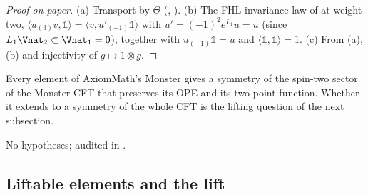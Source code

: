 \begin{proof}[Proof on paper]
(a) Transport by $\Theta$ (, ).  (b) The FHL invariance law of
 at weight two, $\langle u_{(3)}v,\mathbb1\rangle=\langle v,u'_{(-1)}\mathbb1\rangle$ with
$u'=(-1)^2e^{L_1}u=u$ (since $L_1\Vnat_2\subset\Vnat_1=0$), together with $u_{(-1)}\mathbb1=u$ and
$\langle\mathbb1,\mathbb1\rangle=1$.  (c) From (a), (b) and injectivity of $g\mapsto1\otimes g$.
\end{proof}
\begin{physics}
Every element of AxiomMath's Monster gives a symmetry of the spin-two sector of the Monster CFT that
preserves its OPE and its two-point function.  Whether it extends to a symmetry of the whole CFT is the
lifting question of the next subsection.
\end{physics}
\begin{status}
No hypotheses; audited in .
\end{status}

\subsection{Liftable elements and the lift}

